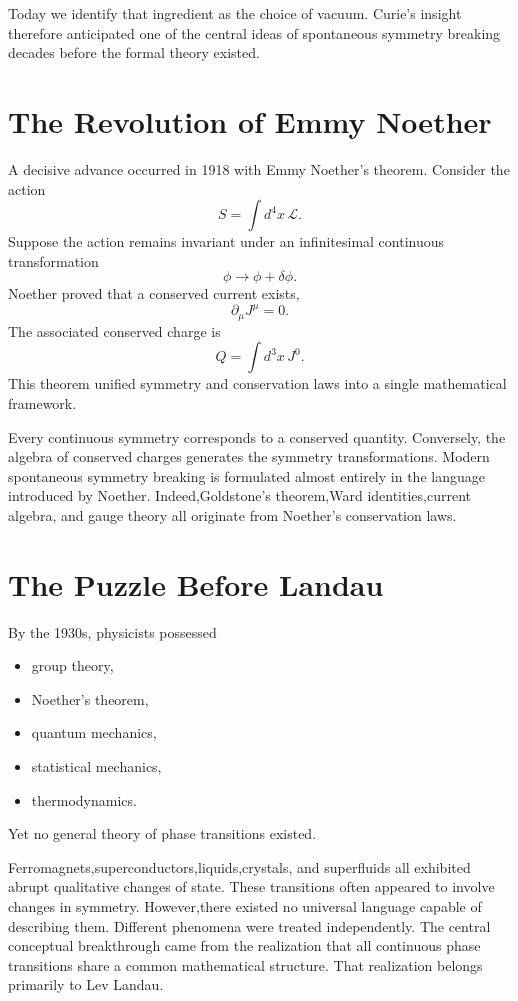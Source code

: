 Today we identify that ingredient as the choice of vacuum.
Curie's insight therefore anticipated one of the central ideas of
spontaneous symmetry breaking decades before the formal theory existed.

\section{The Revolution of Emmy Noether}
A decisive advance occurred in 1918 with Emmy Noether's theorem.
Consider the action
\[S=\int d^4x\,\mathcal L.\]
Suppose the action remains invariant under an infinitesimal continuous
transformation
\[\phi\rightarrow\phi+\delta\phi.\]
Noether proved that a conserved current exists,
\[\partial_\mu J^\mu=0.\]
The associated conserved charge is
\[Q=\int d^3x\,J^0.\]
This theorem unified symmetry and conservation laws into a single
mathematical framework.

Every continuous symmetry corresponds to a conserved quantity.
Conversely,
the algebra of conserved charges generates the symmetry
transformations.
Modern spontaneous symmetry breaking is formulated almost entirely in the
language introduced by Noether.
Indeed,Goldstone's theorem,Ward identities,current algebra,
and gauge theory all originate from Noether's conservation laws.

\section{The Puzzle Before Landau}
By the 1930s, physicists possessed
\begin{itemize}
\item group theory,
\item Noether's theorem,
\item quantum mechanics,
\item statistical mechanics,
\item thermodynamics.
\end{itemize}
Yet no general theory of phase transitions existed.

Ferromagnets,superconductors,liquids,crystals,
and superfluids all exhibited abrupt qualitative changes of state.
These transitions often appeared to involve changes in symmetry.
However,there existed no universal language capable of describing them.
Different phenomena were treated independently.
The central conceptual breakthrough came from the realization that all
continuous phase transitions share a common mathematical structure.
That realization belongs primarily to Lev Landau.

